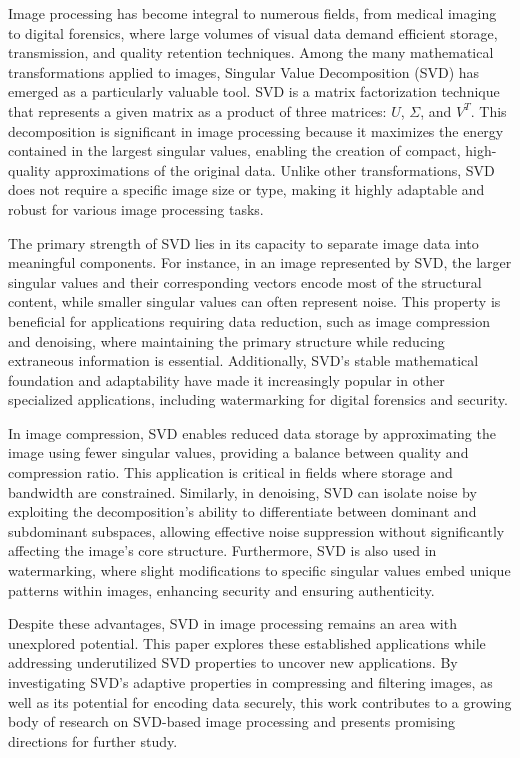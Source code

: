 \documentclass[
  journal,
]{IEEEtran}%
\begin{document}
Image processing has become integral to numerous fields, from medical
imaging to digital forensics, where large volumes of visual data demand
efficient storage, transmission, and quality retention techniques. Among
the many mathematical transformations applied to images, Singular Value
Decomposition (SVD) has emerged as a particularly valuable tool. SVD is
a matrix factorization technique that represents a given matrix as a
product of three matrices: \(U\), \(\Sigma\), and \(V^T\). This
decomposition is significant in image processing because it maximizes
the energy contained in the largest singular values, enabling the
creation of compact, high-quality approximations of the original data.
Unlike other transformations, SVD does not require a specific image size
or type, making it highly adaptable and robust for various image
processing tasks.

The primary strength of SVD lies in its capacity to separate image data
into meaningful components. For instance, in an image represented by
SVD, the larger singular values and their corresponding vectors encode
most of the structural content, while smaller singular values can often
represent noise. This property is beneficial for applications requiring
data reduction, such as image compression and denoising, where
maintaining the primary structure while reducing extraneous information
is essential. Additionally, SVD's stable mathematical foundation and
adaptability have made it increasingly popular in other specialized
applications, including watermarking for digital forensics and security.

In image compression, SVD enables reduced data storage by approximating
the image using fewer singular values, providing a balance between
quality and compression ratio. This application is critical in fields
where storage and bandwidth are constrained. Similarly, in denoising,
SVD can isolate noise by exploiting the decomposition's ability to
differentiate between dominant and subdominant subspaces, allowing
effective noise suppression without significantly affecting the image's
core structure. Furthermore, SVD is also used in watermarking, where
slight modifications to specific singular values embed unique patterns
within images, enhancing security and ensuring authenticity.

Despite these advantages, SVD in image processing remains an area with
unexplored potential. This paper explores these established applications
while addressing underutilized SVD properties to uncover new
applications. By investigating SVD's adaptive properties in compressing
and filtering images, as well as its potential for encoding data
securely, this work contributes to a growing body of research on
SVD-based image processing and presents promising directions for further
study.
\end{document}
